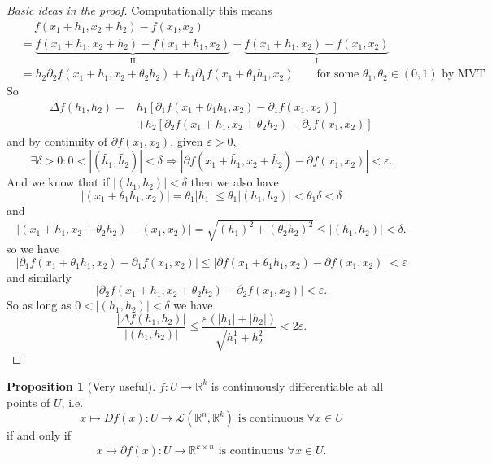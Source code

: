 \documentclass[a4paper]{article}
\theoremstyle{definition}
\newtheorem{prop}[defn]{Proposition}
\begin{document}
\begin{proof}[Basic ideas in the proof]
Computationally this means
\[
\begin{aligned}
&\quad \ f(x_1+h_1,x_2+h_2)-f(x_1,x_2) \\&= \underbrace{f(x_1+h_1,x_2+h_2)-f(x_1+h_1,x_2)}_{\text{II}}+\underbrace{f(x_1+h_1,x_2)-f(x_1,x_2)}_{\text{I}} \\
&= h_2\partial_2 f(x_1+h_1,x_2+\theta_2h_2) + h_1\partial_1 f(x_1+\theta_1h_1,x_2) \qquad \text{for some } \theta_1,\theta_2\in (0,1) \text{ by MVT}
\end{aligned}
\]
So
\[
\begin{aligned}
\Delta f(h_1,h_2)=&h_1 \left[\partial_1 f(x_1+\theta_1h_1,x_2)-\partial_1 f(x_1,x_2) \right]\\&+h_2 \left[\partial_2 f(x_1+h_1,x_2+\theta_2h_2)-\partial_2 f(x_1,x_2) \right]
\end{aligned}
\]
and by continuity of $\partial f(x_1,x_2)$, given $\varepsilon >0,$
\[
\exists \delta>0: 0<|(\tilde{h_1},\tilde{h_2})|<\delta \Rightarrow |\partial f(x_1+\tilde{h_1},x_2+\tilde{h_2})-\partial f(x_1,x_2)|<\varepsilon.
\]
And we know that if $|(h_1,h_2)|<\delta$ then we also have 
\[
|(x_1+\theta_1h_1,x_2)| = \theta_1 |h_1| \leq \theta_1 |(h_1,h_2)| <\theta_1\delta<\delta
\]
and
\[
|(x_1 + h_1 , x_2 + \theta_2h_2) - (x_1 , x_2)| = \sqrt{(h_1)^2 + (\theta_2h_2)^2} \leq |(h_1,h_2)| < \delta.
\]
so we have
\[
|\partial_1 f(x_1+\theta_1h_1,x_2)-\partial_1 f(x_1,x_2)|\leq |\partial f(x_1+\theta_1h_1,x_2)-\partial f(x_1,x_2)| <\varepsilon
\]
and similarly
\[
|\partial_2 f(x_1+h_1,x_2+\theta_2h_2)-\partial_2 f(x_1,x_2)| <\varepsilon .
\]
So as long as $0<|(h_1,h_2)|<\delta$ we have
\[
\frac{|\Delta f(h_1,h_2)|}{|(h_1,h_2)|} \leq \frac{\varepsilon(|h_1|+|h_2|)}{\sqrt{h_1^1+h_2^2}} < 2\varepsilon .
\]
\end{proof}

\begin{prop}[Very useful]
$f:U\rightarrow \mathbb R^k$ is continuously differentiable at all points of $U$, i.e.
\[
x\mapsto Df(x):U\rightarrow \mathcal L(\mathbb R^n,\mathbb R^k) \text{ is continuous } \forall x\in U
\]if and only if
\[
x\mapsto \partial f(x):U\rightarrow \mathbb R^{k\times n} \text{ is continuous } \forall x\in U.
\]
\end{prop}
\end{document}
